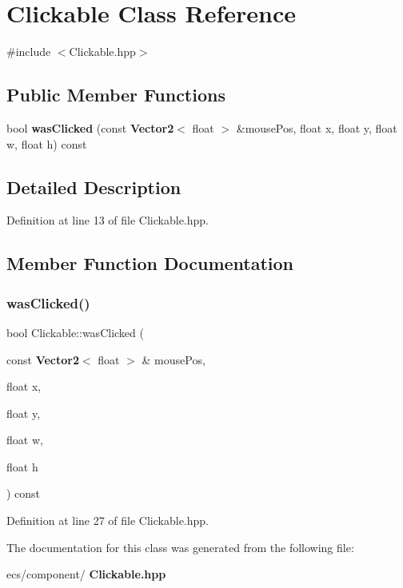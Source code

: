 \section{Clickable Class Reference}
\label{class_clickable}


{\ttfamily \#include $<$Clickable.\+hpp$>$}

\subsection*{Public Member Functions}
\begin{DoxyCompactItemize}
\item 
bool \textbf{ was\+Clicked} (const \textbf{ Vector2}$<$ float $>$ \&mouse\+Pos, float x, float y, float w, float h) const
\end{DoxyCompactItemize}


\subsection{Detailed Description}


Definition at line 13 of file Clickable.\+hpp.



\subsection{Member Function Documentation}
\mbox{\label{class_clickable_a43d73ba123a997e1b44c60058345a867}} 
\subsubsection{was\+Clicked()}
{\footnotesize\ttfamily bool Clickable\+::was\+Clicked (\begin{DoxyParamCaption}\item[{const \textbf{ Vector2}$<$ float $>$ \&}]{mouse\+Pos,  }\item[{float}]{x,  }\item[{float}]{y,  }\item[{float}]{w,  }\item[{float}]{h }\end{DoxyParamCaption}) const\hspace{0.3cm}{\ttfamily [inline]}}



Definition at line 27 of file Clickable.\+hpp.



The documentation for this class was generated from the following file\+:\begin{DoxyCompactItemize}
\item 
ecs/component/\textbf{ Clickable.\+hpp}\end{DoxyCompactItemize}
